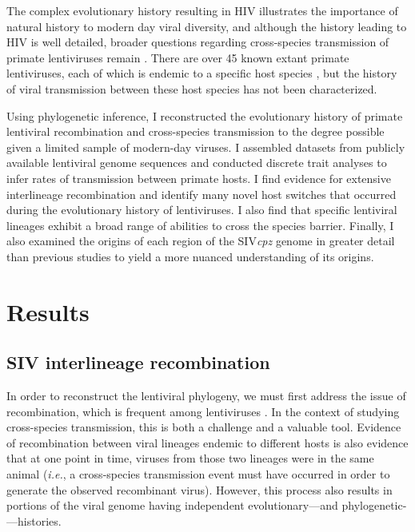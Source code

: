 The complex evolutionary history resulting in HIV illustrates the importance of natural history to modern day viral diversity, and although the history leading to HIV is well detailed, broader questions regarding cross-species transmission of primate lentiviruses remain \citep{gifford2012viral}.
There are over 45 known extant primate lentiviruses, each of which is endemic to a specific host species \citep{aghokeng2007full,apetrei2004history,sharp2011origins}, but the history of viral transmission between these host species has not been characterized.

Using phylogenetic inference, I reconstructed the evolutionary history of primate lentiviral recombination and cross-species transmission to the degree possible given a limited sample of modern-day viruses.
I assembled datasets from publicly available lentiviral genome sequences and conducted discrete trait analyses to infer rates of transmission between primate hosts.
I find evidence for extensive interlineage recombination and identify many novel host switches that occurred during the evolutionary history of lentiviruses.
I also find that specific lentiviral lineages exhibit a broad range of abilities to cross the species barrier.
Finally, I also examined the origins of each region of the SIV\textit{cpz} genome in greater detail than previous studies to yield a more nuanced understanding of its origins.
\clearpage


\section{Results}

\subsection{SIV interlineage recombination}
In order to reconstruct the lentiviral phylogeny, we must first address the issue of recombination, which is frequent among lentiviruses \citep{chen2006high}.
In the context of studying cross-species transmission, this is both a challenge and a valuable tool.
Evidence of recombination between viral lineages endemic to different hosts is also evidence that at one point in time, viruses from those two lineages were in the same animal (\textit{i.e.}, a cross-species transmission event must have occurred in order to generate the observed recombinant virus).
However, this process also results in portions of the viral genome having independent evolutionary---and phylogenetic-—histories.

